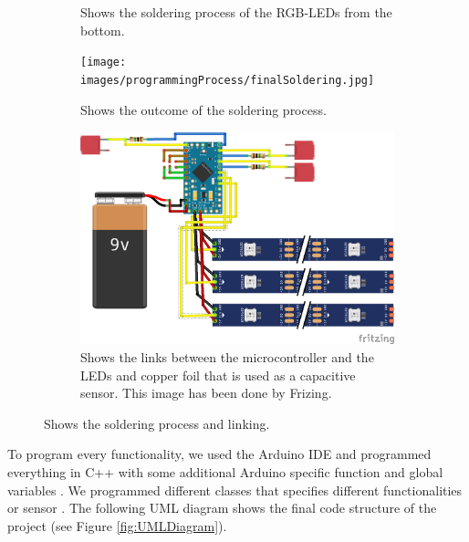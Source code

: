 \documentclass[04_projectProcess.tex]{subfiles}
\begin{document}
\begin{flushleft}
\begin{figure}[H]
\begin{subfigure}{.45\textwidth}
                \caption{Shows the soldering process of the RGB-LEDs from the bottom.}
                \label{fig:solderingProcess_2}
                \vspace{6mm}
            \end{subfigure}
            \begin{subfigure}{.45\textwidth}
                \centering
                \texttt{[image: images/programmingProcess/finalSoldering.jpg]}
                \caption{Shows the outcome of the soldering process.} 
                \label{fig:finalSoldering}
                \vspace{6mm}
            \end{subfigure}
            \begin{subfigure}{.45\textwidth}
                \centering
                \includegraphics[width=0.8\linewidth]{images/programmingProcess/sensorLinks.png}
                \caption{Shows the links between the microcontroller and the LEDs and copper foil that is 
                used as a capacitive sensor. This image has been done by Frizing. \cite{fritzing}}
                \label{fig:solderingProcess_3}
                \vspace{6mm}
            \end{subfigure}
            \caption{Shows the soldering process and linking.}
            \label{fig:solderingProcess}
        \end{figure}

        \noindent
        To program every functionality, we used the Arduino IDE and programmed everything in C++ with 
        some additional Arduino specific function and global variables \cite{introductionArduino}. 
        We programmed different classes that specifies different functionalities or sensor \cite{
        arduinoClasses}. The following UML diagram shows the final code structure of the project (see 
        Figure \ref{fig:UMLDiagram}).


\end{flushleft}
\end{document}
